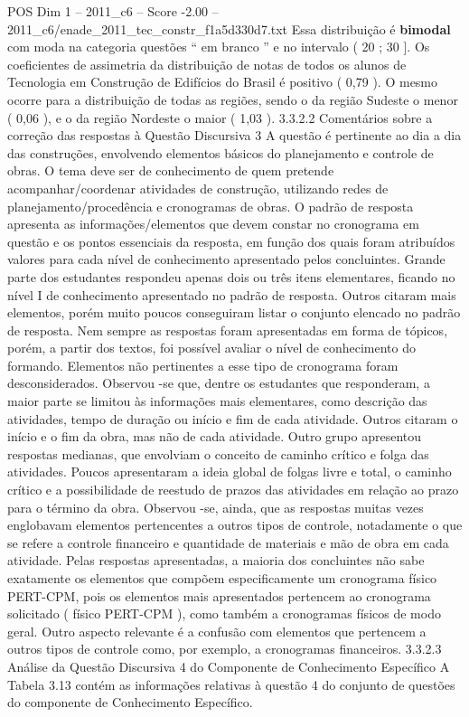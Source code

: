 \begin{textsample}{POS Dim 1 – 2011\_c6 – Score -2.00 – 2011\_c6/enade\_2011\_tec\_constr\_f1a5d330d7.txt}
Essa distribuição é \textbf{bimodal} com moda na categoria questões “ em branco ” e no intervalo ( 20 ; 30 ].
Os coeficientes de assimetria da distribuição de notas de todos os alunos de Tecnologia em Construção de Edifícios do Brasil é positivo ( 0,79 ).
O mesmo ocorre para a distribuição de todas as regiões, sendo o da região Sudeste o menor ( 0,06 ), e o da região Nordeste o maior ( 1,03 ). 3.3.2.2 Comentários sobre a correção das respostas à Questão Discursiva 3 A questão é pertinente ao dia a dia das construções, envolvendo elementos básicos do planejamento e controle de obras.
O tema deve ser de conhecimento de quem pretende acompanhar/coordenar atividades de construção, utilizando redes de planejamento/procedência e cronogramas de obras.
O padrão de resposta apresenta as informações/elementos que devem constar no cronograma em questão e os pontos essenciais da resposta, em função dos quais foram atribuídos valores para cada nível de conhecimento apresentado pelos concluintes.
Grande parte dos estudantes respondeu apenas dois ou três itens elementares, ficando no nível I de conhecimento apresentado no padrão de resposta.
Outros citaram mais elementos, porém muito poucos conseguiram listar o conjunto elencado no padrão de resposta.
Nem sempre as respostas foram apresentadas em forma de tópicos, porém, a partir dos textos, foi possível avaliar o nível de conhecimento do formando.
Elementos não pertinentes a esse tipo de cronograma foram desconsiderados.
Observou -se que, dentre os estudantes que responderam, a maior parte se limitou às informações mais elementares, como descrição das atividades, tempo de duração ou início e fim de cada atividade.
Outros citaram o início e o fim da obra, mas não de cada atividade.
Outro grupo apresentou respostas medianas, que envolviam o conceito de caminho crítico e folga das atividades.
Poucos apresentaram a ideia global de folgas livre e total, o caminho crítico e a possibilidade de reestudo de prazos das atividades em relação ao prazo para o término da obra.
Observou -se, ainda, que as respostas muitas vezes englobavam elementos pertencentes a outros tipos de controle, notadamente o que se refere a controle financeiro e quantidade de materiais e mão de obra em cada atividade.
Pelas respostas apresentadas, a maioria dos concluintes não sabe exatamente os elementos que compõem especificamente um cronograma físico PERT-CPM, pois os elementos mais apresentados pertencem ao cronograma solicitado ( físico PERT-CPM ), como também a cronogramas físicos de modo geral.
Outro aspecto relevante é a confusão com elementos que pertencem a outros tipos de controle como, por exemplo, a cronogramas financeiros. 3.3.2.3 Análise da Questão Discursiva 4 do Componente de Conhecimento Específico A Tabela 3.13 contém as informações relativas à questão 4 do conjunto de questões do componente de Conhecimento Específico.

\end{textsample}
